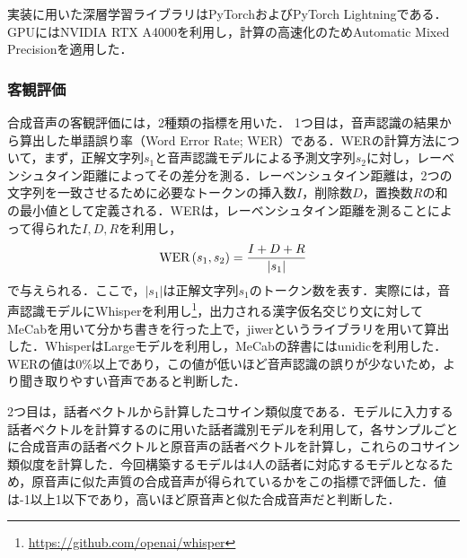 実装に用いた深層学習ライブラリはPyTorchおよびPyTorch Lightningである．GPUにはNVIDIA RTX A4000を利用し，計算の高速化のためAutomatic Mixed Precisionを適用した．

\subsubsection{客観評価}
合成音声の客観評価には，2種類の指標を用いた．
1つ目は，音声認識の結果から算出した単語誤り率（Word Error Rate; WER）である．WERの計算方法について，まず，正解文字列$s_{1}$と音声認識モデルによる予測文字列$s_{2}$に対し，レーベンシュタイン距離によってその差分を測る．レーベンシュタイン距離は，2つの文字列を一致させるために必要なトークンの挿入数$I$，削除数$D$，置換数$R$の和の最小値として定義される．WERは，レーベンシュタイン距離を測ることによって得られた$I, D, R$を利用し，
\begin{equation}
    \text{WER}\left(s_{1}, s_{2}\right) = \frac{I + D + R}{|s_{1}|}
\end{equation}
で与えられる．ここで，$|s_{1}|$は正解文字列$s_{1}$のトークン数を表す．実際には，音声認識モデルにWhisper\cite{radford2023robust}を利用し\footnote{\url{https://github.com/openai/whisper}}，出力される漢字仮名交じり文に対してMeCabを用いて分かち書きを行った上で，jiwerというライブラリを用いて算出した．WhisperはLargeモデルを利用し，MeCabの辞書にはunidicを利用した．WERの値は0\%以上であり，この値が低いほど音声認識の誤りが少ないため，より聞き取りやすい音声であると判断した．

2つ目は，話者ベクトルから計算したコサイン類似度である．モデルに入力する話者ベクトルを計算するのに用いた話者識別モデルを利用して，各サンプルごとに合成音声の話者ベクトルと原音声の話者ベクトルを計算し，これらのコサイン類似度を計算した．今回構築するモデルは4人の話者に対応するモデルとなるため，原音声に似た声質の合成音声が得られているかをこの指標で評価した．値は-1以上1以下であり，高いほど原音声と似た合成音声だと判断した．

